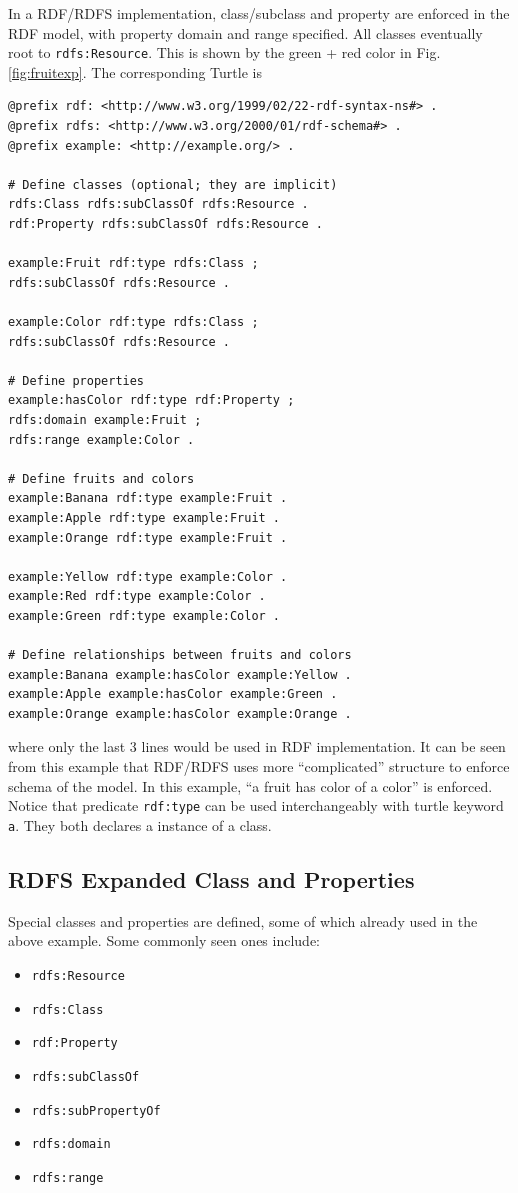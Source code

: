 In a RDF/RDFS implementation, class/subclass and property are enforced in the RDF model, with property domain and range specified. All classes eventually root to \verb|rdfs:Resource|. This is shown by the green + red color in Fig. \ref{fig:fruitexp}. The corresponding Turtle is
\begin{lstlisting}
@prefix rdf: <http://www.w3.org/1999/02/22-rdf-syntax-ns#> .
@prefix rdfs: <http://www.w3.org/2000/01/rdf-schema#> .
@prefix example: <http://example.org/> .

# Define classes (optional; they are implicit)
rdfs:Class rdfs:subClassOf rdfs:Resource .
rdf:Property rdfs:subClassOf rdfs:Resource .

example:Fruit rdf:type rdfs:Class ;
rdfs:subClassOf rdfs:Resource .

example:Color rdf:type rdfs:Class ;
rdfs:subClassOf rdfs:Resource .

# Define properties
example:hasColor rdf:type rdf:Property ;
rdfs:domain example:Fruit ;
rdfs:range example:Color .

# Define fruits and colors
example:Banana rdf:type example:Fruit .
example:Apple rdf:type example:Fruit .
example:Orange rdf:type example:Fruit .

example:Yellow rdf:type example:Color .
example:Red rdf:type example:Color .
example:Green rdf:type example:Color .

# Define relationships between fruits and colors
example:Banana example:hasColor example:Yellow .
example:Apple example:hasColor example:Green .
example:Orange example:hasColor example:Orange .

\end{lstlisting}
where only the last 3 lines would be used in RDF implementation. It can be seen from this example that RDF/RDFS uses more ``complicated'' structure to enforce schema of the model. In this example, ``a fruit has color of a color'' is enforced. Notice that predicate \verb|rdf:type| can be used interchangeably with turtle keyword \verb|a|. They both declares a instance of a class.

\subsection{RDFS Expanded Class and Properties}

Special classes and properties are defined, some of which already used in the above example. Some commonly seen ones include:
\begin{itemize}
	\item \verb|rdfs:Resource|
	\item \verb|rdfs:Class|
	\item \verb|rdf:Property|
	\item \verb|rdfs:subClassOf|
	\item \verb|rdfs:subPropertyOf|
	\item \verb|rdfs:domain|
	\item \verb|rdfs:range|
\end{itemize}

